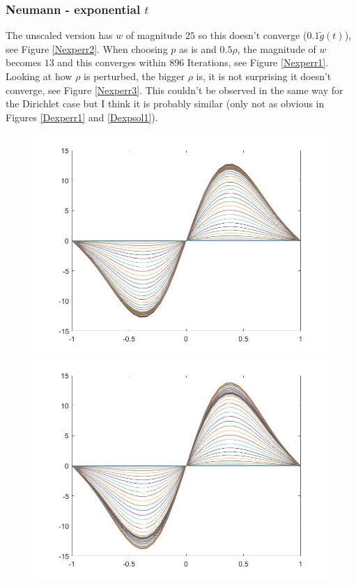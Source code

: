 \documentclass[11pt, a4paper]{article}
\theoremstyle{definition}
\begin{document}
\subsubsection{Neumann - exponential $t$}
The unscaled version has $w$ of magnitude $25$ so this doesn't converge ($0.1 \tilde g(t)$), see Figure \ref{Nexperr2}. When choosing $p$ as is and $0.5\rho$, the magnitude of $w$ becomes $13$ and this converges within $896$ Iterations, see Figure \ref{Nexperr1}. 
Looking at how $\rho$ is perturbed, the bigger $\rho$ is, it is not surprising it doesn't converge, see Figure \ref{Nexperr3}. This couldn't be observed in the same way for the Dirichlet case but I think it is probably similar (only not as obvious in Figures \ref{Dexperr1} and \ref{Dexpsol1}). 
\begin{figure}[h]
	\includegraphics[scale=0.3]{Nexpw1.jpg}
	\includegraphics[scale=0.3]{Nexpw2.jpg}

\end{figure}
\end{document}
